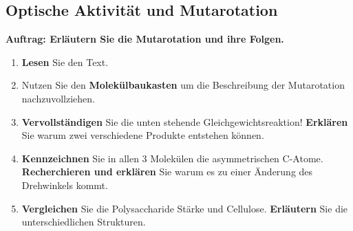 \documentclass{scrartcl}  %
\begin{document}
		\subsection{Optische Aktivität und Mutarotation}
		
			\textbf{Auftrag: Erläutern Sie die Mutarotation und ihre Folgen.}
			\begin{enumerate}
			   \item \textbf{Lesen} Sie den Text.
			   \item Nutzen Sie den \textbf{Molekülbaukasten} um die Beschreibung der Mutarotation nachzuvollziehen.
			   \item \textbf{Vervollständigen} Sie die unten stehende Gleichgewichtsreaktion! \textbf{Erklären} Sie warum zwei verschiedene Produkte entstehen können.
			   \item \textbf{Kennzeichnen} Sie in allen 3 Molekülen die asymmetrischen C-Atome. \textbf{Recherchieren und erklären} Sie warum es zu einer Änderung des Drehwinkels kommt.
			   \item \textbf{Vergleichen} Sie die Polysaccharide Stärke und Cellulose. \textbf{Erläutern} Sie die unterschiedlichen Strukturen.
			\end{enumerate}
			
\end{document}
